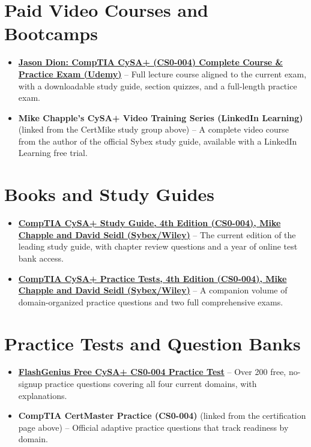 \documentclass[11pt,letterpaper]{article}
\begin{document}
\section{Paid Video Courses and Bootcamps}
\begin{itemize}
\item \textbf{\href{https://www.udemy.com/course/comptia-cysa-003/}{Jason Dion: CompTIA CySA+ (CS0-004) Complete Course \& Practice Exam (Udemy)}} -- Full lecture course aligned to the current exam, with a downloadable study guide, section quizzes, and a full-length practice exam.
\item \textbf{Mike Chapple's CySA+ Video Training Series (LinkedIn Learning)} (linked from the CertMike study group above) -- A complete video course from the author of the official Sybex study guide, available with a LinkedIn Learning free trial.
\end{itemize}

\section{Books and Study Guides}
\begin{itemize}
\item \textbf{\href{https://www.wiley.com/en-us/comptia-cysa-study-guide-exam-cs0-004-4th-edition-p-9781394414895}{CompTIA CySA+ Study Guide, 4th Edition (CS0-004), Mike Chapple and David Seidl (Sybex/Wiley)}} -- The current edition of the leading study guide, with chapter review questions and a year of online test bank access.
\item \textbf{\href{https://www.amazon.com/CompTIA-CySA-Practice-Tests-CS0-004/dp/1394414471}{CompTIA CySA+ Practice Tests, 4th Edition (CS0-004), Mike Chapple and David Seidl (Sybex/Wiley)}} -- A companion volume of domain-organized practice questions and two full comprehensive exams.
\end{itemize}

\section{Practice Tests and Question Banks}
\begin{itemize}
\item \textbf{\href{https://flashgenius.net/blog-article/ultimate-guide-to-comptia-cysa-certification}{FlashGenius Free CySA+ CS0-004 Practice Test}} -- Over 200 free, no-signup practice questions covering all four current domains, with explanations.
\item \textbf{CompTIA CertMaster Practice (CS0-004)} (linked from the certification page above) -- Official adaptive practice questions that track readiness by domain.
\end{itemize}
\end{document}
